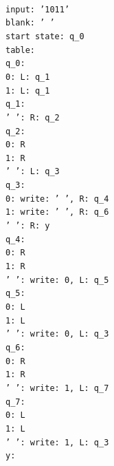 \documentclass[a4paper]{article}
\begin{document}
\begin{changemargin}{1.77 cm}{0 cm}
\texttt
{
\\
input: '1011' \\
blank: ' ' \\
start state: q\_0 \\
table: \\
  q\_0: \\
    0: {L: q\_1} \\
    1: {L: q\_1} \\
  q\_1: \\
    ' ': {R: q\_2} \\
  q\_2: \\
    0: R \\
    1: R \\
    ' ': {L: q\_3} \\
  q\_3: \\
    0: {write: ' ', R: q\_4} \\
    1: {write: ' ', R: q\_6} \\
    ' ': {R: y} \\
  q\_4: \\
    0: R \\
    1: R \\
    ' ': {write: 0, L: q\_5} \\
  q\_5: \\
    0: L \\
    1: L \\
    ' ': {write: 0, L: q\_3} \\
  q\_6: \\
    0: R \\
    1: R \\
    ' ': {write: 1, L: q\_7} \\
  q\_7: \\
    0: L \\
    1: L \\
    ' ': {write: 1, L: q\_3} \\
  y: \\
}
\end{changemargin}
\newpage
\end{document}

